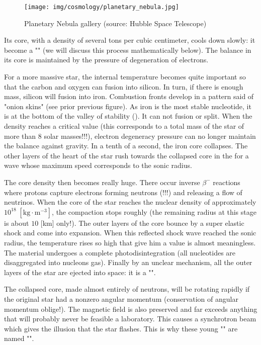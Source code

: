 	\begin{figure}[H]
		\begin{center}
		\texttt{[image: img/cosmology/planetary\_nebula.jpg]}
		\end{center}	
		\caption{Planetary Nebula gallery (source: Hubble Space Telescope)}
	\end{figure}
	Its core, with a density of several tons per cubic centimeter, cools down slowly: it become a "" (we will discuss this process mathematically below). The balance in its core is maintained by the pressure of degeneration of electrons.
	
	For a more massive star, the internal temperature becomes quite important so that the carbon and oxygen can fusion into silicon. In turn, if there is enough mass, silicon will fusion into iron. Combustion fronts develop in a pattern said of "onion skins" (see prior previous figure). As iron is the most stable nucleotide,  it is at the bottom of the valley of stability (). It can not fusion or split. When the density reaches a critical value (this corresponds to a total mass of the star of more than $8$ solar masses!!!), electron degeneracy pressure can no longer maintain the balance against gravity. In a tenth of a second, the iron core collapses. The other layers of the heart of the star rush towards the collapsed core in the for a wave whose maximum speed corresponds to the sonic radius.
	
	The core density then becomes really huge. There occur inverse $\beta^-$ reactions where protons capture electrons forming neutrons (!!!) and releasing a flow of neutrinos. When the core of the star reaches the nuclear density of approximately $10^{18}\;[\text{kg}\cdot\text{m}^{-3}]$, the compaction stops roughly (the remaining radius at this stage is about $10$ [km] only!). The outer layers of the core bounce by a super elastic shock and come into expansion. When this reflected shock wave reached the sonic radius, the temperature rises so high that give him a value is almost meaningless. The material undergoes a complete photodisintegration (all nucleotides are disaggregated into nucleons gas). Finally by an unclear mechanism, all the outer layers of the star are ejected into space: it is a "".
	
	The collapsed core, made almost entirely of neutrons, will be rotating rapidly if the original star had a nonzero angular momentum (conservation of angular momentum oblige!). The magnetic field is also preserved and far exceeds anything that will probably never be feasible a laboratory. This causes a synchrotron beam which gives the illusion that the star flashes. This is why these young "" are named "".
	
